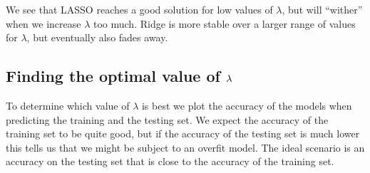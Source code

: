 \documentclass[letterpaper,10pt,english]{sphinxmanual}
\begin{document}
\begin{sphinxVerbatim}[commandchars=\\\{\}]
        \PYG{p}{[}\PYG{p}{]}\PYG{p}{[}\PYG{p}{]}   
        \PYG{p}{[}\PYG{p}{]}\PYG{p}{[}\PYG{p}{]}   

           

          
         
           
          

\end{sphinxVerbatim}

We see that LASSO reaches a good solution for low
values of \(\lambda\), but will “wither” when we increase \(\lambda\) too
much. Ridge is more stable over a larger range of values for
\(\lambda\), but eventually also fades away.


\subsection{Finding the optimal value of \protect\(\lambda\protect\)}
\label{\detokenize{chapter4:finding-the-optimal-value-of-lambda}}
To determine which value of \(\lambda\) is best we plot the accuracy of
the models when predicting the training and the testing set. We expect
the accuracy of the training set to be quite good, but if the accuracy
of the testing set is much lower this tells us that we might be
subject to an overfit model. The ideal scenario is an accuracy on the
testing set that is close to the accuracy of the training set.
\end{document}
